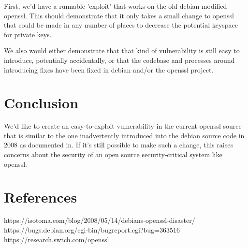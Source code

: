 \documentclass[conference]{IEEEtran}
\begin{document}
First, we'd have a runnable 'exploit' that works on the old
debian-modified openssl. This should demonstrate that it only takes a
small change to openssl that could be made in any number of places to
decrease the potential keyspace for private keys.

We also would either demonstrate that that kind of vulnerability is
still easy to introduce, potentially accidentally, or that the
codebase and processes around introducing fixes have been fixed in
debian and/or the openssl project.

\section{Conclusion}
We'd like to create an easy-to-exploit vulnerability in the current
openssl source that is similar to the one inadvertently introduced
into the debian source code in 2008 as documented in\cite{1}. If it's still possible to
make such a change, this raises concerns about the security of an open
source security-critical system like openssl.

\section*{References}
\begin{thebibliography}{00}

 https://isotoma.com/blog/2008/05/14/debians-openssl-disaster/
 https://bugs.debian.org/cgi-bin/bugreport.cgi?bug=363516
 https://research.swtch.com/openssl  
\end{thebibliography}
\end{document}
